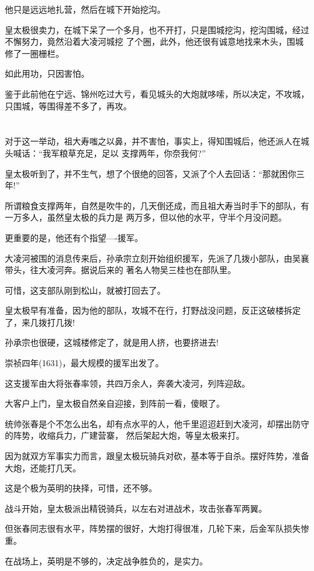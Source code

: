 \documentclass[11pt,a4paper,onecolumn]{article}
\begin{document}
他只是远远地扎营，然后在城下开始挖沟。

皇太极很卖力，在城下呆了一个多月，也不开打，只是围城挖沟，挖沟围城，经过不懈努力，竟然沿着大凌河城挖
了个圈，此外，他还很有诚意地找来木头，围城修了一圈栅栏。

如此用功，只因害怕。

鉴于此前他在宁远、锦州吃过大亏，看见城头的大炮就哆嗦，所以决定，不攻城，只围城，等围得差不多了，再攻。

\section[\thesection]{}

对于这一举动，祖大寿嗤之以鼻，并不害怕，事实上，得知围城后，他还派人在城头喊话：``我军粮草充足，足以
支撑两年，你奈我何?''

皇太极听到了，并不生气，想了个很绝的回答，又派了个人去回话：``那就困你三年!''

所谓粮食支撑两年，自然是吹牛的，几天倒还成，而且祖大寿当时手下的部队，有一万多人，虽然皇太极的兵力是
两万多，但以他的水平，守半个月没问题。

更重要的是，他还有个指望----援军。

大凌河被围的消息传来后，孙承宗立刻开始组织援军，先派了几拨小部队，由吴襄带头，往大凌河奔。据说后来的
著名人物吴三桂也在部队里。

可惜，这支部队刚到松山，就被打回去了。

皇太极早有准备，因为他的部队，攻城不在行，打野战没问题，反正这破楼拆定了，来几拨打几拨!

孙承宗也很硬，这城楼修定了，就是用人挤，也要挤进去!

崇祯四年(1631)，最大规模的援军出发了。

这支援军由大将张春率领，共四万余人，奔袭大凌河，列阵迎敌。

大客户上门，皇太极自然亲自迎接，到阵前一看，傻眼了。

统帅张春是个不怎么出名，却有点水平的人，他千里迢迢赶到大凌河，却摆出防守的阵势，收缩兵力，广建营寨，
然后架起大炮，等皇太极来打。

因为就双方军事实力而言，跟皇太极玩骑兵对砍，基本等于自杀。摆好阵势，准备大炮，还能打几天。

这是个极为英明的抉择，可惜，还不够。

战斗开始，皇太极派出精锐骑兵，以左右对进战术，攻击张春军两翼。

但张春同志很有水平，阵势摆的很好，大炮打得很准，几轮下来，后金军队损失惨重。

在战场上，英明是不够的，决定战争胜负的，是实力。
\end{document}

